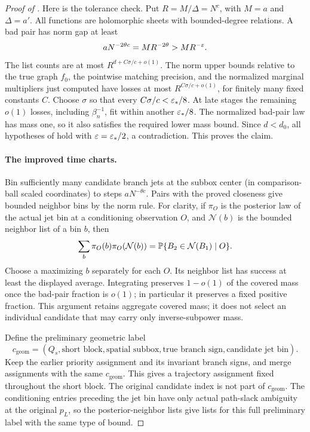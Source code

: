 \begin{proof}[Proof of ]
Here is the tolerance check.  Put \(R=M/\Delta=N^c\), with
\(M=a\) and \(\Delta=a'\).  All functions are holomorphic sheets
with bounded-degree relations.  A bad pair has norm gap at least
\[
 aN^{-2\theta c}=MR^{-2\theta}>MR^{-\varepsilon}.
\]
The list counts are at most \(R^{d+C\sigma/c+o(1)}\).
The norm upper bounds relative to the true graph \(f_0\), the
pointwise matching precision, and the normalized marginal multipliers
just computed have losses at most \(R^{C\sigma/c+o(1)}\), for
finitely many fixed constants \(C\).  Choose \(\sigma\) so that
every \(C\sigma/c<\varepsilon_*/8\).  At late stages the remaining
\(o(1)\) losses, including \(\beta_n^{-1}\), fit within another
\(\varepsilon_*/8\).  The normalized bad-pair law has mass one, so it
also satisfies the required lower mass bound.  Since \(d<d_0\),
all hypotheses of  hold with
\(\varepsilon=\varepsilon_*/2\), a contradiction.  This proves the claim.

\paragraph{The improved time charts.}
Bin sufficiently many candidate branch jets at the subbox center (in comparison-ball scaled coordinates) to steps \(aN^{-\theta c}\). Pairs with the proved closeness give bounded neighbor bins by the norm rule. For clarity, if \(\pi_O\) is the posterior law of the actual jet bin
at a conditioning observation \(O\), and \(\mathcal N(b)\) is the
bounded neighbor list of a bin \(b\), then
\begin{equation}
\sum_b\pi_O(b)\pi_O(\mathcal N(b))
 =
 \mathbb P\{B_2\in\mathcal N(B_1)\mid O\}.
 \label{a03:posterior-neighbors}
\end{equation}
Choose a maximizing \(b\) separately for each \(O\).  Its neighbor list
has success at least the displayed average.  Integrating preserves
\(1-o(1)\) of the covered mass once the bad-pair fraction is \(o(1)\);
in particular it preserves a fixed positive fraction.  This argument retains aggregate covered mass; it does not select an
individual candidate that may carry only inverse-subpower mass.

Define the preliminary geometric label
\[
 c_{\mathrm{geom}}=(Q_s,\text{short block},\text{spatial subbox},
             \text{true branch sign},\text{candidate jet bin}).
\]
Keep the earlier priority assignment and its invariant branch signs,
and merge assignments with the same \(c_{\mathrm{geom}}\).  This gives a trajectory
assignment fixed throughout the short block.  The original candidate
index is not part of \(c_{\mathrm{geom}}\).  The conditioning entries preceding the
jet bin have only actual path-slack ambiguity at the original
\(p_L\), so the posterior-neighbor lists give lists for this full
preliminary label with the same type of bound.


\end{proof}
